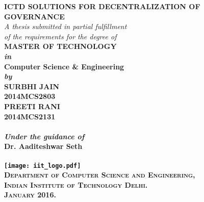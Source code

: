 \begin{titlepage}
\begin{center}

\LARGE{\textsf{\bfseries ICTD SOLUTIONS FOR DECENTRALIZATION OF GOVERNANCE}}\\
\vspace{20pt}
\normalsize
\emph{A thesis submitted in partial fulfillment} \\
\emph{of the requirements for the degree of} \\
\vspace{20pt}
\bfseries MASTER OF TECHNOLOGY \\
\vspace{10pt}
\emph {in}\\
\vspace{10pt}
\bfseries Computer Science \& Engineering \\
\vspace{10pt}
\emph {by}\\
\vspace{10pt}
\Large{\textsf{\bfseries SURBHI JAIN}} \\
{\normalsize \textsf{\bfseries 2014MCS2803}}\\
\Large{\textsf{\bfseries PREETI RANI}} \\
{\normalsize \textsf{\bfseries 2014MCS2131}}\\
\ \\

{\normalsize \emph {Under the guidance of}}
\ \\
\Large{\textsf{\bfseries Dr. Aaditeshwar Seth}} \\
\ \\
\vspace{15pt}
\texttt{[image: iit\_logo.pdf]} \\
\vspace{10pt}
\large{\textsc{Department of Computer Science and Engineering,\\
Indian Institute of Technology Delhi.\\ January 2016.}}
\end{center}
\end{titlepage}
